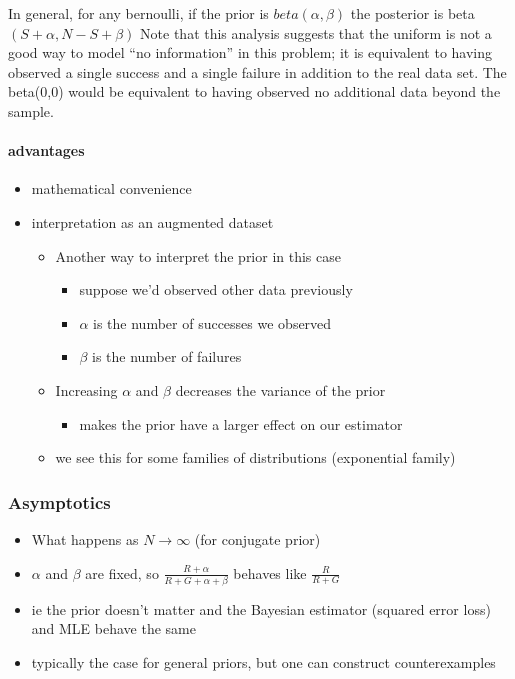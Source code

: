 \begin{itemize}[leftmargin=0pt]
  In general, for any bernoulli, if the prior is $beta(\alpha,\beta)$ the
  posterior is beta$(S + \alpha, N - S + \beta)$ Note that this analysis
  suggests that the uniform is not a good way to model ``no
  information'' in this problem; it is equivalent to having observed a
  single success and a single failure in addition to the real data
  set.  The beta(0,0) would be equivalent to having observed no
  additional data beyond the sample.
\end{itemize}

\paragraph{advantages}
\begin{itemize}
\item mathematical convenience
\item interpretation as an augmented dataset
\begin{itemize}
\item Another way to interpret the prior in this case
\begin{itemize}
\item suppose we'd observed other data previously
\item $\alpha$ is the number of successes we observed
\item $\beta$ is the number of failures
\end{itemize}
\item Increasing $\alpha$ and $\beta$ decreases the variance of the prior
\begin{itemize}
\item makes the prior have a larger effect on our estimator
\end{itemize}
\item we see this for some families of distributions (exponential family)
\end{itemize}
\end{itemize}

\subsubsection{Asymptotics}

\begin{itemize}[leftmargin=0pt]
\item What happens as $N \to \infty$ (for conjugate prior)
\item $\alpha$ and $\beta$ are fixed, so $\frac{R + \alpha}{R + G + \alpha + \beta}$ behaves
  like $\frac{R}{R+G}$
\item ie the prior doesn't matter and the Bayesian estimator
       (squared error loss) and MLE behave the same
\item typically the case for general priors, but one can construct
       counterexamples
\end{itemize}


